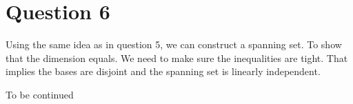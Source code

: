 \section*{Question 6}
Using the same idea as in question 5, we can construct a spanning set. To show that the dimension equals. We need to make sure the inequalities are tight. That implies the bases are disjoint and the spanning set is linearly independent. 

To be continued